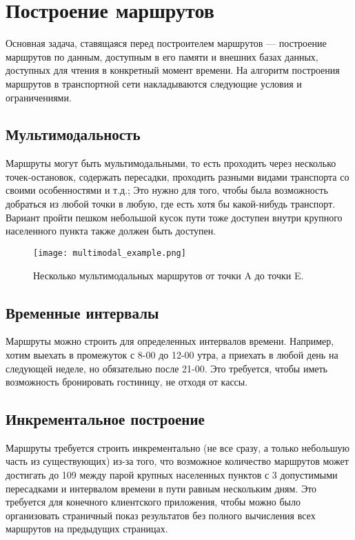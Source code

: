 \section{Построение маршрутов}
Основная задача, ставящаяся перед построителем маршрутов — построение маршрутов по данным, доступным в его памяти и внешних базах данных, доступных для чтения в конкретный момент времени. На алгоритм построения маршрутов в транспортной сети накладываются следующие условия и ограничениями.

\subsection{Мультимодальность}
Маршруты могут быть мультимодальными, то есть проходить через несколько точек-остановок, содержать пересадки, проходить разными видами транспорта со своими особенностями и т.д.; Это нужно для того, чтобы была возможность добраться из любой точки в любую, где есть хотя бы какой-нибудь транспорт. Вариант пройти пешком небольшой кусок пути тоже доступен внутри крупного населенного пункта также должен быть доступен.
\begin{figure}[!h]
    \centering
    \texttt{[image: multimodal\_example.png]}
    \caption{Несколько мультимодальных маршрутов от точки A до точки E.}\label{fig1}
\end{figure}

\subsection{Временные интервалы}
Маршруты можно строить для определенных интервалов времени. Например, хотим выехать в промежуток с 8-00 до 12-00 утра, а приехать в любой день на следующей неделе, но обязательно после 21-00. Это требуется, чтобы иметь возможность бронировать гостиницу, не отходя от кассы.

\subsection{Инкрементальное построение}
Маршруты требуется строить инкрементально (не все сразу, а только небольшую часть из существующих) из-за того, что возможное количество маршрутов может достигать до 109 между парой крупных населенных пунктов с 3 допустимыми пересадками и интервалом времени в пути равным нескольким дням. Это требуется для конечного клиентского приложения, чтобы можно было организовать страничный показ результатов без полного вычисления всех маршрутов на предыдущих страницах.

